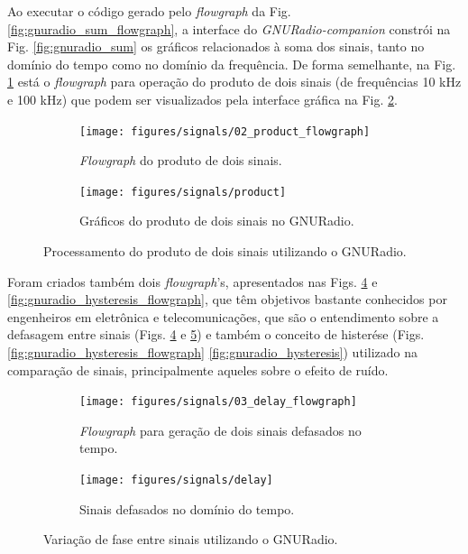 \documentclass[
  12pt,				%
  openright,			%
  twoside,			%
  a4paper,			%
  english,			%
  french,				%
  spanish,			%
  brazil,				%
  ]{abntex2}
\begin{document}
Ao executar o código gerado pelo \textit{flowgraph} da Fig. \ref{fig:gnuradio_sum_flowgraph}, a interface do \textit{GNURadio-companion} constrói na Fig. \ref{fig:gnuradio_sum} os gráficos
relacionados à soma dos sinais, tanto no domínio do tempo como no domínio da frequência. De forma semelhante, na Fig. \ref{fig:gnuradio_product_flowgraph} está o \textit{flowgraph} para
operação do produto de dois sinais (de frequências 10 kHz e 100 kHz) que podem ser visualizados pela interface gráfica na Fig. \ref{fig:gnuradio_product}.

\begin{figure}[!htb]
  \centering
  \begin{subfigure}[b]{0.8\linewidth}
    \centering
    \caption{\textit{Flowgraph} do produto de dois sinais.}
    \texttt{[image: figures/signals/02\_product\_flowgraph]}
    \label{fig:gnuradio_product_flowgraph}
  \end{subfigure}

  \begin{subfigure}[b]{0.8\linewidth}
    \centering
    \caption{Gráficos do produto de dois sinais no GNURadio.}
    \texttt{[image: figures/signals/product]}
    \label{fig:gnuradio_product}
  \end{subfigure}
  \caption{Processamento do produto de dois sinais utilizando o GNURadio.}
  \label{fig:gnuradio_signals_product}
\end{figure}

Foram criados também dois \textit{flowgraph}'s, apresentados nas Figs. \ref{fig:gnuradio_delay_flowgraph} e \ref{fig:gnuradio_hysteresis_flowgraph}, que têm objetivos bastante
conhecidos por engenheiros em eletrônica e telecomunicações, que são o entendimento sobre a defasagem entre sinais (Figs. \ref{fig:gnuradio_delay_flowgraph} e \ref{fig:gnuradio_delay})
e também o conceito de histerése (Figs. \ref{fig:gnuradio_hysteresis_flowgraph}
\ref{fig:gnuradio_hysteresis}) utilizado na comparação de sinais, principalmente aqueles sobre o efeito de ruído.

\begin{figure}[!htb]
  \centering
  \begin{subfigure}[b]{\linewidth}
    \centering
    \caption{\textit{Flowgraph} para geração de dois sinais defasados no tempo.}
    \texttt{[image: figures/signals/03\_delay\_flowgraph]}
    \label{fig:gnuradio_delay_flowgraph}
  \end{subfigure}

  \begin{subfigure}[b]{\linewidth}
    \centering
    \caption{Sinais defasados no domínio do tempo.}
    \texttt{[image: figures/signals/delay]}
    \label{fig:gnuradio_delay}
  \end{subfigure}
  \caption{Variação de fase entre sinais utilizando o GNURadio.}
  \label{fig:gnuradio_signals_delay}
\end{figure}
\end{document}
